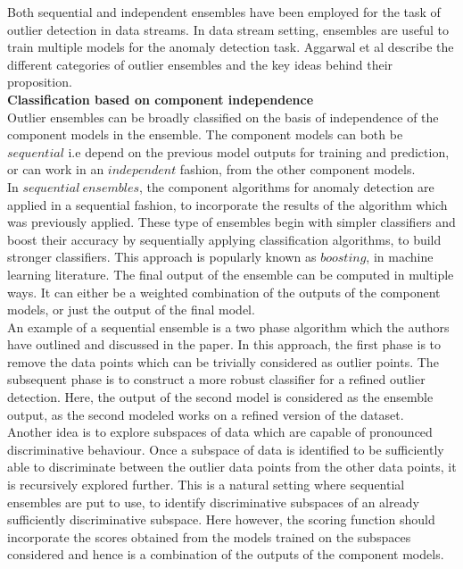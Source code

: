 Both sequential and independent ensembles\cite{RayanaZA16}\cite{aggarwal2013outlier} have been employed for the task of outlier detection in data streams. In data stream setting, ensembles are useful to train multiple models for the anomaly detection task. Aggarwal et al describe the different categories of outlier ensembles and the key ideas behind their proposition\cite{aggarwal2013outlier}. \\

\noindent \textbf{Classification based on component independence} \\

Outlier ensembles can be broadly classified on the basis of independence of the component models in the ensemble. The component models can both be $sequential$ i.e depend on the previous model outputs for training and prediction, or can work in an $independent$ fashion, from the other component models. \\

In $sequential\ ensembles$, the component algorithms for anomaly detection are applied in a sequential fashion, to incorporate the results of the algorithm which was previously applied. These type of ensembles begin with simpler classifiers and boost their accuracy by sequentially applying classification algorithms, to build stronger classifiers. This approach is popularly known as $boosting$, in machine learning literature. The final output of the ensemble can be computed in multiple ways. It can either be a weighted combination of the outputs of the component models, or just the output of the final model. \\

An example of a sequential ensemble is a two phase algorithm which the authors have outlined and discussed in the paper. In this approach, the first phase is to remove the data points which can be trivially considered as outlier points. The subsequent phase is to construct a more robust classifier for a refined outlier detection. Here, the output of the second model is considered as the ensemble output, as the second modeled works on a refined version of the dataset. \\

Another idea is to explore subspaces of data which are capable of pronounced discriminative behaviour. Once a subspace of data is identified to be sufficiently able to discriminate between the outlier data points from the other data points, it is recursively explored further. This is a natural setting where sequential ensembles are put to use, to identify discriminative subspaces of an already sufficiently discriminative subspace. Here however, the scoring function should incorporate the scores obtained from the models trained on the subspaces considered and hence is a combination of the outputs of the component models. \\

